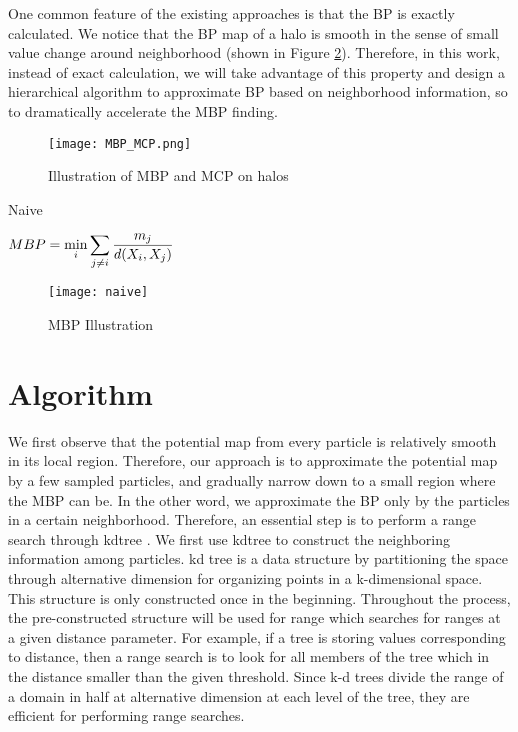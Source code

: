  
 One common feature of the existing approaches is that the BP is exactly calculated. We notice that the BP map of a halo is smooth in the sense of small value change around neighborhood (shown in Figure \ref{fig:naive}). Therefore, in this work, instead of exact calculation, we will take advantage of this property and design a hierarchical algorithm to approximate BP based on neighborhood information, so to dramatically accelerate the MBP finding. 
\begin{figure}[H]
\centering
\label{mbp_mcp}
    \texttt{[image: MBP\_MCP.png]}
    \caption{Illustration of MBP and MCP on halos}
\end{figure}
 \begin{algorithm}
\caption{Naive}
\label{naive}
\begin{algorithmic}[1]
  \State $\displaystyle MBP=\min_i \displaystyle\sum_{j\neq i}\frac{m_j}{d(X_i,X_j)}$
\end{algorithmic} 
 \end{algorithm}
\begin{figure}[H]
\centering
\texttt{[image: naive]}%
\caption{MBP Illustration}
\label{fig:naive}
\end{figure}
\section{Algorithm}
We first observe that the potential map from every particle is relatively smooth in its local region. Therefore, our approach is to approximate the potential map by a few sampled particles, and gradually narrow down to a small region where the MBP can be. In the other word, we approximate the BP only by the particles in a certain neighborhood. Therefore, an essential step is to perform a range search through kdtree \cite{kakde2005range}. We first use kdtree to construct the neighboring information among particles. kd tree is a data structure by partitioning the space through alternative dimension for organizing points in a k-dimensional space. This structure is only constructed once in the beginning. Throughout the process, the pre-constructed structure will be used for range which searches for ranges at a given distance parameter. For example, if a tree is storing values corresponding to distance, then a range search is to look for all members of the tree which in the distance smaller than the given threshold. Since k-d trees divide the range of a domain in half at alternative dimension at each level of the tree, they are efficient for performing range searches.  

